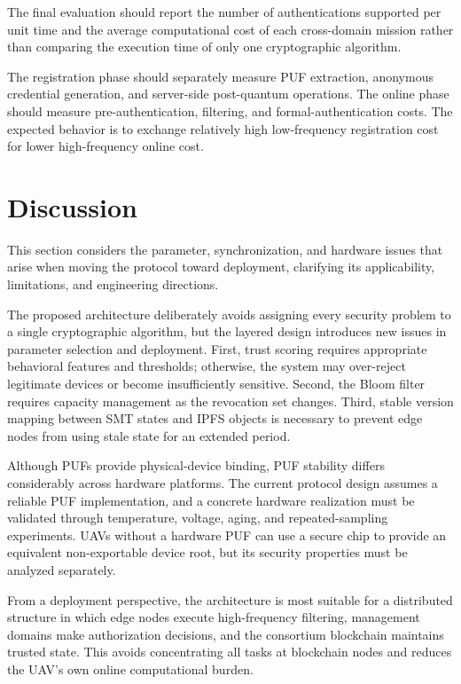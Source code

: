\documentclass[lettersize,journal]{IEEEtran}
\begin{document}
	The final evaluation should report the number of authentications supported per unit time and the average computational cost of each cross-domain mission rather than comparing the execution time of only one cryptographic algorithm.
	
	The registration phase should separately measure PUF extraction, anonymous credential generation, and server-side post-quantum operations. The online phase should measure pre-authentication, filtering, and formal-authentication costs. The expected behavior is to exchange relatively high low-frequency registration cost for lower high-frequency online cost.
	
	\section{Discussion}
	This section considers the parameter, synchronization, and hardware issues that arise when moving the protocol toward deployment, clarifying its applicability, limitations, and engineering directions.
	
	
	The proposed architecture deliberately avoids assigning every security problem to a single cryptographic algorithm, but the layered design introduces new issues in parameter selection and deployment. First, trust scoring requires appropriate behavioral features and thresholds; otherwise, the system may over-reject legitimate devices or become insufficiently sensitive. Second, the Bloom filter requires capacity management as the revocation set changes. Third, stable version mapping between SMT states and IPFS objects is necessary to prevent edge nodes from using stale state for an extended period.
	
	Although PUFs provide physical-device binding, PUF stability differs considerably across hardware platforms. The current protocol design assumes a reliable PUF implementation, and a concrete hardware realization must be validated through temperature, voltage, aging, and repeated-sampling experiments. UAVs without a hardware PUF can use a secure chip to provide an equivalent non-exportable device root, but its security properties must be analyzed separately.
	
	From a deployment perspective, the architecture is most suitable for a distributed structure in which edge nodes execute high-frequency filtering, management domains make authorization decisions, and the consortium blockchain maintains trusted state. This avoids concentrating all tasks at blockchain nodes and reduces the UAV's own online computational burden.
	
\end{document}
